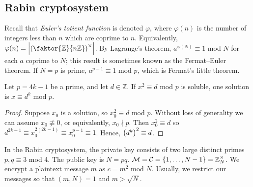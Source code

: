 \subsection{Rabin cryptosystem}
Recall that \emph{Euler's totient function} is denoted \( \varphi \), where \( \varphi(n) \) is the number of integers less than \( n \) which are coprime to \( n \).
Equivalently, \( \varphi(n) = \abs{\qty(\faktor{\mathbb Z}{n\mathbb Z})^\times} \).
By Lagrange's theorem, \( a^{\varphi(N)} \equiv 1 \) mod \( N \) for each \( a \) coprime to \( N \); this result is sometimes known as the Fermat--Euler theorem.
If \( N = p \) is prime, \( a^{p-1} \equiv 1 \) mod \( p \), which is Fermat's little theorem.
\begin{lemma}
    Let \( p = 4k - 1 \) be a prime, and let \( d \in \mathbb Z \).
    If \( x^2 \equiv d \) mod \( p \) is soluble, one solution is \( x \equiv d^k \) mod \( p \).
\end{lemma}
\begin{proof}
    Suppose \( x_0 \) is a solution, so \( x_0^2 \equiv d \) mod \( p \).
    Without loss of generality we can assume \( x_0 \not\equiv 0 \), or equivalently, \( x_0 \nmid p \).
    Then \( x_0^2 \equiv d \) so \( d^{2k-1} \equiv x_0^{2(2k-1)} \equiv x_0^{p-1} \equiv 1 \).
    Hence, \( \qty(d^k)^2 \equiv d \).
\end{proof}
In the Rabin cryptosystem, the private key consists of two large distinct primes \( p, q \equiv 3 \) mod 4.
The public key is \( N = pq \).
\( \mathcal M = \mathcal C = \qty{1, \dots, N-1} = \mathbb Z_N^\times \).
We encrypt a plaintext message \( m \) as \( c = m^2 \) mod \( N \).
Usually, we restrict our messages so that \( (m, N) = 1 \) and \( m > \sqrt{N} \).

